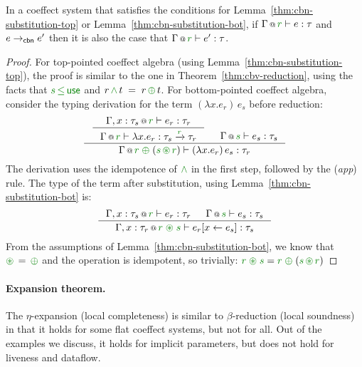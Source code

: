 \begin{theorem}
\label{thm:cbn-flat}
In a coeffect system that satisfies the conditions for Lemma~\ref{thm:cbn-substitution-top} or
Lemma~\ref{thm:cbn-substitution-bot}, if $\coctx{\Gamma}{\cclrd{r}} \vdash e : \tau$
and $e \rightarrow_{\textnormal{\sffamily cbn}} e'$ then it is also the case that $\coctx{\Gamma}{\cclrd{r}} \vdash e' : \tau$.
\end{theorem}
\begin{proof}

For top-pointed coeffect algebra (using Lemma~\ref{thm:cbn-substitution-top}), the proof is similar
to the one in Theorem~\ref{thm:cbv-reduction}, using the facts that $\cclrd{s} \,\cleq\, \cunit$
and $r \,\czip\, t \;=\; r \,\cpar\, t$.
For bottom-pointed coeffect algebra, consider the typing derivation for the term
$(\lambda x.e_r)\,e_s$ before reduction:
%
\begin{equation*}
\inference
  { \inference
      {\coctx{\Gamma, x:\tau_s}{\cclrd{r}} \vdash e_r : \tau_r}
      {\coctx{\Gamma}{\cclrd{r}} \vdash \lambda x.e_r : \tau_s \xrightarrow{\cclrd{r}} \tau_r } &
   \coctx{\Gamma}{\cclrd{s}} \vdash e_s : \tau_s }
  {\coctx{\Gamma}{\cclrd{r} \;\cpar\; (\cclrd{s} \,\cseq\, \cclrd{r})} \vdash (\lambda x.e_r)\,e_s : \tau_r }
\end{equation*}
%
The derivation uses the idempotence of $\czip$ in the first step, followed by the
(\emph{app}) rule. The type of the term after substitution, using Lemma~\ref{thm:cbn-substitution-bot} is:
%
\begin{equation*}
\inference
  { \coctx{\Gamma, x:\tau_s}{\cclrd{r}} \vdash e_r : \tau_r &
    \coctx{\Gamma}{\cclrd{s}} \vdash e_s : \tau_s }
  { \coctx{\Gamma, x:\tau_r}{\cclrd{r}\;\cseq\;\cclrd{s}} \vdash \subst{e_r}{x}{e_s} : \tau_s }
\end{equation*}
%
From the assumptions of Lemma~\ref{thm:cbn-substitution-bot}, we know that $\cseq\,=\,\cpar$
and the operation is idempotent, so trivially:
$\cclrd{r}\;\cseq\;\cclrd{s} = \cclrd{r} \;\cpar\; (\cclrd{s} \,\cseq\, \cclrd{r})$
\end{proof}

\paragraph{Expansion theorem.}
The $\eta$-expansion (local completeness) is similar to $\beta$-reduction (local soundness) in that
it holds for some flat coeffect systems, but not for all. Out of the examples we discuss, it
holds for implicit parameters, but does not hold for liveness and dataflow.

